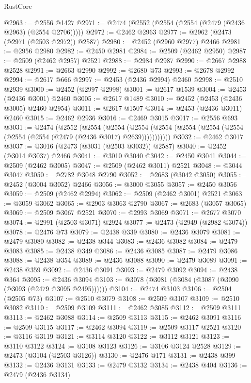\begin{lexlean}{RustCore}
\begin{coremodule}
@2963 := @2556 @1427
@2971 := @2474 (@2552 (@2554 (@2554 (@2479 (@2436 @2963) (@2554 @2706)))))
@2972 := @2462 @2963
@2977 := @2962 (@2473 (@2971 (@2503 @2972)) @2587)
@2980 := @2452 (@2960 @2977) @2466
@2981 := @2956 @2980
@2982 := @2450 @2981
@2984 := @2509 (@2462 @2950)
@2987 := @2509 (@2462 @2957) @2521
@2988 := @2984 @2987
@2990 := @2667 @2988 @2528
@2991 := @2663 @2990
@2992 := @2680 @73
@2993 := @2678 @2992
@2994 := @2617 @666
@2997 := @2453 (@2436 @2994) @2460
@2998 := @2510 @2939
@3000 := @2452 (@2997 @2998)
@3001 := @2617 @1539
@3004 := @2453 (@2436 @3001) @2460
@3005 := @2617 @1489
@3010 := @2452 (@2453 (@2436 @3005) @2460 @2954)
@3011 := @2617 @1507
@3014 := @2453 (@2436 @3011) @2460
@3015 := @2462 @2936
@3016 := @2469 @3015
@3017 := @2556 @693
@3031 := @2474
    (@2552
      (@2554
        (@2554
          (@2554 (@2554 (@2554 (@2554 (@2554 (@2554 (@2554 (@2479 (@2436 @3017) @2639)))))))))))
@3032 := @2462 @3017
@3037 := @3016 (@2473 (@3031 (@2503 @3032)) @2587)
@3040 := @2452 (@3014 @3037) @2466
@3041 := @3010 @3040
@3042 := @2450 @3041
@3044 := @2509 (@2462 @3005)
@3047 := @2509 (@2462 @3011) @2521
@3048 := @3044 @3047
@3050 := @2782 @3048 @2790
@3052 := @2683 (@3042 @3050)
@3055 := @2452 (@3004 @3052) @2466
@3056 := @3000 @3055
@3057 := @2450 @3056
@3059 := @2509 (@2462 @2994)
@3062 := @2509 (@2462 @3001) @2521
@3063 := @3059 @3062
@3065 := @2903 @3063 @2790
@3067 := @2683 (@3057 @3065)
@3069 := @2509 @3067 @2521
@3070 := @2993 @3069
@3071 := @2677 @3070
@3074 := @2991 (@2503 @3071) @2924
@3077 := @2473 (@2949 (@2982 @3074))
@3078 := @2476 @73
@3079 := @2438 @339
@3080 := @2436 @3079
@3081 := @2479 @3080
@3082 := @2438 @344
@3083 := @2436 @3082
@3084 := @2479 @3083
@3085 := @2438 @349
@3086 := @2436 @3085
@3087 := @2479 @3086
@3088 := @2438 @354
@3089 := @2436 @3088
@3090 := @2479 @3089
@3091 := @2438 @359
@3092 := @2436 @3091
@3093 := @2479 @3092
@3094 := @2438 @364
@3095 := @2436 @3094
@3103 := @3078 (@3081 (@3084 (@3087 (@3090 (@3093 (@2479 @3095 @2495))))))
@3104 := @2474 @3103
@3106 := @2504 (@2505 @73)
@3107 := @2510 @3079
@3108 := @2509 @3107
@3109 := @2510 @3082
@3110 := @2509 @3109
@3111 := @2462 @3085
@3112 := @2509 @3111
@3113 := @2462 @3088
@3114 := @2509 @3113
@3115 := @2462 @3091
@3116 := @2509 @3115
@3117 := @2462 @3094
@3119 := @2509 @3117 @2521
@3120 := @3116 @3119
@3121 := @3114 @3120
@3122 := @3112 @3121
@3123 := @3110 @3122
@3124 := @3108 @3123
@3126 := @3106 @3124 @2528
@3129 := @2473 (@3104 (@2503 @3126))
@3130 := @2476 @171
@3131 := @2438 @399
@3132 := @2436 @3131
@3133 := @2479 @3132
@3134 := @2438 @404
@3136 := @2479 (@2436 @3134)

\end{coremodule}
\end{lexlean}
